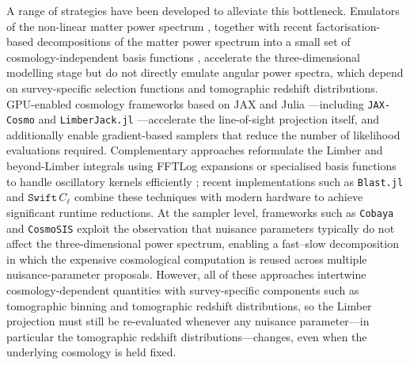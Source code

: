 A range of strategies have been developed to alleviate this bottleneck. Emulators of the non-linear matter power spectrum \citep{2019MNRAS.484.5509E, 2021MNRAS.505.2840E, 2017ApJ...847...50L, 2023MNRAS.520.3443M, 2019ApJ...875...69D, 2023JCAP...07..054D, 2025SCPMA..6889512C}, together with recent factorisation-based decompositions of the matter power spectrum into a small set of cosmology-independent basis functions \citep{2025PhRvL.134s1002B}, accelerate the three-dimensional modelling stage but do not directly emulate angular power spectra, which depend on survey-specific selection functions and tomographic redshift distributions. GPU-enabled cosmology frameworks based on JAX \citep{2021ascl.soft11002B} and Julia \citep{2017SIAMR..59...65B}---including \texttt{JAX-Cosmo} \citep{2023OJAp....6E..15C} and \texttt{LimberJack.jl} \citep{2024OJAp....7E..11R}---accelerate the line-of-sight projection itself, and additionally enable gradient-based samplers that reduce the number of likelihood evaluations required. Complementary approaches reformulate the Limber and beyond-Limber integrals using FFTLog \citep{2000MNRAS.312..257H} expansions or specialised basis functions to handle oscillatory kernels efficiently \citep[e.g.][]{2017A&A...602A..72C, 2017JCAP...11..054A, 2018JCAP...10..047S, 2018PhRvD..97b3504G, 2020JCAP...05..010F, 2023PhRvD.108j3007F, 2025JOSS...10.8618R}; recent implementations such as \texttt{Blast.jl} \citep{2024OJAp....7E.112C} and \(\texttt{Swift}\,C_\ell\) \citep{2025arXiv250522718R} combine these techniques with modern hardware to achieve significant runtime reductions. At the sampler level, frameworks such as \texttt{Cobaya} \citep{2021JCAP...05..057T} and \texttt{CosmoSIS} \citep{2015A&C....12...45Z} exploit the observation that nuisance parameters typically do not affect the three-dimensional power spectrum, enabling a fast--slow decomposition in which the expensive cosmological computation is reused across multiple nuisance-parameter proposals. However, all of these approaches intertwine cosmology-dependent quantities with survey-specific components such as tomographic binning and tomographic redshift distributions, so the Limber projection must still be re-evaluated whenever any nuisance parameter---in particular the tomographic redshift distributions---changes, even when the underlying cosmology is held fixed.

